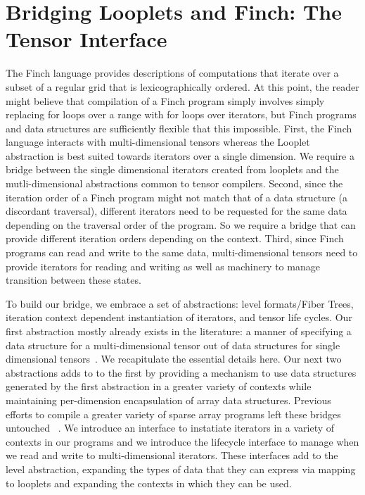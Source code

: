\section{Bridging Looplets and Finch: The Tensor Interface}

%
The Finch language provides descriptions of computations that iterate over a subset of a regular grid that is lexicographically ordered.
%
At this point, the reader might believe that compilation of a Finch program simply involves simply replacing for loops over a range with for loops over iterators, but Finch programs and data structures are sufficiently flexible that this impossible.
%
First, the Finch language interacts with multi-dimensional tensors whereas the Looplet abstraction is best suited towards iterators over a single dimension.
%
We require a bridge between the single dimensional iterators created from looplets and the mutli-dimensional abstractions common to tensor compilers.
%
Second, since the iteration order of a Finch program might not match that of a data structure (a discordant traversal), different iterators need to be requested for the same data depending on the traversal order of the program.
%
So we require a bridge that can provide different iteration orders depending on the context.
%
Third, since Finch programs can read and write to the same data, multi-dimensional tensors need to provide iterators for reading and writing as well as machinery to manage transition between these states.


To build our bridge, we embrace a set of abstractions: level formats/Fiber Trees, iteration context dependent instantiation of iterators, and tensor life cycles.
%
Our first abstraction mostly already exists in the literature: a manner of specifying a data structure for a multi-dimensional tensor out of data structures for single dimensional tensors~\cite{sze2017efficient,chou2022compilation, chou2018format}.
%
We recapitulate the essential details here.
%
Our next two abstractions adds to to the first by providing a mechanism to use data structures generated by the first abstraction in a greater variety of contexts while maintaining per-dimension encapsulation of array data structures.
%
Previous efforts to compile a greater variety of sparse array programs left these bridges untouched ~\cite{henry_compilation_2021, won2023unified, senanayake2020sparse}.
%
We introduce an interface to instatiate iterators in a variety of contexts in our programs and we introduce the lifecycle interface to manage when we read and write to multi-dimensional iterators.
%
These interfaces add to the level abstraction, expanding the types of data that they can express via mapping to looplets and expanding the contexts in which they can be used.

